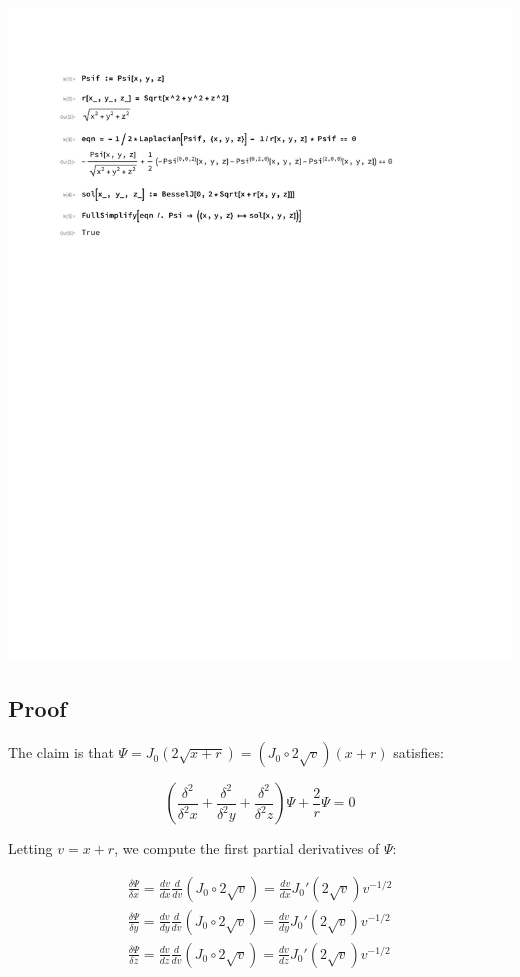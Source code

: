 \documentclass{article}
\begin{document}
\includegraphics[page=1, clip, trim=1in 7in 1in 1in, width=\textwidth]{improved.pdf}

\vfill\eject
\subsection*{Proof}
The claim is that $\Psi = J_0(2\sqrt{x+r}) = (J_0 \circ 2\sqrt{v}) (x+r)$ satisfies:

\begin{equation}
\label{claim}
\left(\frac{\delta^2}{\delta^2 x} + \frac{\delta^2}{\delta^2 y} + \frac{\delta^2}{\delta^2 z}\right) \Psi + \frac{2}{r}\Psi = 0
\end{equation}

\vskip 12pt

Letting $v=x+r$, we compute the first partial derivatives of $\Psi$:

\begin{equation}
\begin{gathered}
\frac{\delta \Psi}{\delta x} = \frac{d v}{d x} \frac{d}{d v} \left(J_0 \circ 2\sqrt{v}\right) = \frac{d v}{d x} J_0'(2\sqrt{v}) v^{-1/2} \\
\frac{\delta \Psi}{\delta y} = \frac{d v}{d y} \frac{d}{d v} \left(J_0 \circ 2\sqrt{v}\right) = \frac{d v}{d y} J_0'(2\sqrt{v}) v^{-1/2} \\
\frac{\delta \Psi}{\delta z} = \frac{d v}{d z} \frac{d}{d v} \left(J_0 \circ 2\sqrt{v}\right) = \frac{d v}{d z} J_0'(2\sqrt{v}) v^{-1/2}
\end{gathered}
\end{equation}
\end{document}
